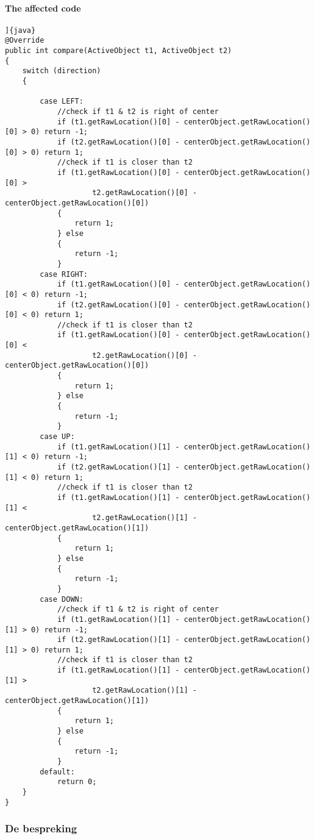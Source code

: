 \documentclass[a4paper]{article}
\begin{document}
\paragraph{The affected code}
\begin{verbatim}]{java}
@Override
public int compare(ActiveObject t1, ActiveObject t2)
{
	switch (direction)
	{

		case LEFT:
			//check if t1 & t2 is right of center
			if (t1.getRawLocation()[0] - centerObject.getRawLocation()[0] > 0) return -1;
			if (t2.getRawLocation()[0] - centerObject.getRawLocation()[0] > 0) return 1;
			//check if t1 is closer than t2
			if (t1.getRawLocation()[0] - centerObject.getRawLocation()[0] >
					t2.getRawLocation()[0] - centerObject.getRawLocation()[0])
			{
				return 1;
			} else
			{
				return -1;
			}
		case RIGHT:
			if (t1.getRawLocation()[0] - centerObject.getRawLocation()[0] < 0) return -1;
			if (t2.getRawLocation()[0] - centerObject.getRawLocation()[0] < 0) return 1;
			//check if t1 is closer than t2
			if (t1.getRawLocation()[0] - centerObject.getRawLocation()[0] <
					t2.getRawLocation()[0] - centerObject.getRawLocation()[0])
			{
				return 1;
			} else
			{
				return -1;
			}
		case UP:
			if (t1.getRawLocation()[1] - centerObject.getRawLocation()[1] < 0) return -1;
			if (t2.getRawLocation()[1] - centerObject.getRawLocation()[1] < 0) return 1;
			//check if t1 is closer than t2
			if (t1.getRawLocation()[1] - centerObject.getRawLocation()[1] <
					t2.getRawLocation()[1] - centerObject.getRawLocation()[1])
			{
				return 1;
			} else
			{
				return -1;
			}
		case DOWN:
			//check if t1 & t2 is right of center
			if (t1.getRawLocation()[1] - centerObject.getRawLocation()[1] > 0) return -1;
			if (t2.getRawLocation()[1] - centerObject.getRawLocation()[1] > 0) return 1;
			//check if t1 is closer than t2
			if (t1.getRawLocation()[1] - centerObject.getRawLocation()[1] >
					t2.getRawLocation()[1] - centerObject.getRawLocation()[1])
			{
				return 1;
			} else
			{
				return -1;
			}
		default:
			return 0;
	}
}
\end{verbatim}
\subsubsection{De bespreking}
\end{document}
